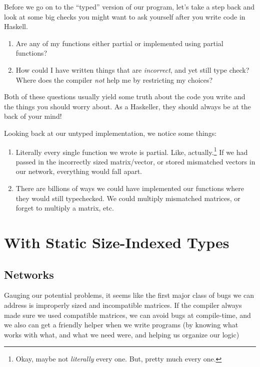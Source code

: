 \documentclass[]{article}
\begin{document}
Before we go on to the ``typed'' version of our program, let's take a step back
and look at some big checks you might want to ask yourself after you write code
in Haskell.

\begin{enumerate}
\def\labelenumi{\arabic{enumi}.}
\tightlist
\item
  Are any of my functions either partial or implemented using partial functions?
\item
  How could I have written things that are \emph{incorrect}, and yet still type
  check? Where does the compiler \emph{not} help me by restricting my choices?
\end{enumerate}

Both of these questions usually yield some truth about the code you write and
the things you should worry about. As a Haskeller, they should always be at the
back of your mind!

Looking back at our untyped implementation, we notice some things:

\begin{enumerate}
\def\labelenumi{\arabic{enumi}.}
\tightlist
\item
  Literally every single function we wrote is partial. Like, actually.\footnote{Okay,
    maybe not \emph{literally} every one. But, pretty much every one.} If we had
  passed in the incorrectly sized matrix/vector, or stored mismatched vectors in
  our network, everything would fall apart.
\item
  There are billions of ways we could have implemented our functions where they
  would still typechecked. We could multiply mismatched matrices, or forget to
  multiply a matrix, etc.
\end{enumerate}

\section{With Static Size-Indexed Types}\label{with-static-size-indexed-types}

\subsection{Networks}\label{networks}

Gauging our potential problems, it seems like the first major class of bugs we
can address is improperly sized and incompatible matrices. If the compiler
always made sure we used compatible matrices, we can avoid bugs at compile-time,
and we also can get a friendly helper when we write programs (by knowing what
works with what, and what we need were, and helping us organize our logic)
\end{document}
